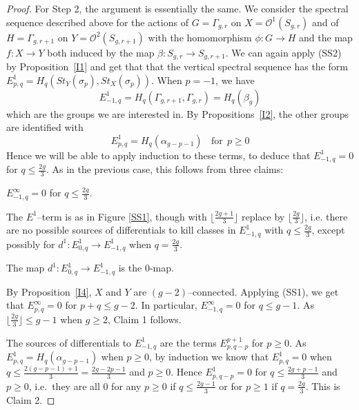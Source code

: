\documentclass[10pt]{amsart}
\newcommand{\no}{\noindent}
\newcommand{\OO}{\mathcal{O}}
\newcommand{\al}{\alpha}
\newcommand{\Ga}{\Gamma}
\newcommand{\s}{\sigma}
\begin{document}
\begin{proof}
For Step 2, the argument is essentially the same. 
We consider the spectral sequence described above for the actions of $G=\Ga_{g,r}$ on $X=\OO^1(S_{g,r})$ and of 
$H=\Ga_{g,r+1}$ on $Y=\OO^2(S_{g,r+1})$ with the homomorphism $\phi\colon G\to H$ and the map $f\colon X\to Y$ both induced by the map
$\beta\colon S_{g,r}\to S_{g,r+1}$.  
We can again apply (SS2) by Proposition~\ref{I1} and get that 
 that the vertical spectral sequence has the form 
$E^1_{p,q}=H_q(St_Y(\s_p),St_X(\s_p))$. 
When $p=-1$, we have  
$$E^1_{-1,q}=H_q(\Ga_{g,r+1},\Ga_{g,r})=H_q(\beta_g)$$ which are the groups we are interested in. 
By Propositions~\ref{I2}, the other groups are identified with 
$$E_{p,q}^1=H_q(\al_{g-p-1}) \ \ \ \ \textrm{for}\ \  p\ge 0$$
Hence we will be able to apply induction to these terms, 
to deduce that $E^1_{-1,q}=0$  for $q\le \frac{2g}{3}$. 
As in the previous case, this follows from three claims: 

\smallskip
\no {\em Claim 1:} 
$E^\infty_{-1,q}=0$ for $q\le \frac{2g}{3}$. 

\smallskip 
\no {\em Claim 2:} 
The $E^1$--term is as in Figure \ref{SS1}, though with $\lfloor \frac{2g+1}{3}\rfloor$ replace by
$\lfloor \frac{2g}{3}\rfloor$, i.e. there are no possible sources of differentials to kill classes in
$E^1_{-1,q}$ with $q\le \frac{2g}{3}$, except possibly for $d^1\colon E^1_{0,q}\to E^1_{-1,q}$ when $q=\frac{2g}{3}$. 

\smallskip
\no {\em Claim 3:} 
The map $d^1\colon E^1_{0,q}\to E^1_{-1,q}$ is the 0-map. 




By Proposition~\ref{I4}, $X$ and $Y$ are $(g-2)$--connected. Applying (SS1), we get that $E^\infty_{p,q}=0$ for 
$p+q\le g-2$. In particular, $E^\infty_{-1,q}=0$ for $q\le g-1$. As $\lfloor\frac{2g}{3}\rfloor\le g-1$ when $g\ge 2$, Claim 1
follows. 
 
The sources of differentials to $E_{-1,q}^1$ are the terms $E^{p+1}_{p,q-p}$ for $p\ge 0$. As
$E^1_{p,q}=H_{q}(\al_{g-p-1})$ when $p\ge 0$, by
induction we know that $E^1_{p,q}=0$ when $q\le \frac{2(g-p-1)+1}{3}=\frac{2g-2p-1}{3}$ and $p\ge 0$. 
Hence $E^1_{p,q-p}=0$ for $q\le \frac{2g+p-1}{3}$ and $p\ge 0$, i.e.~they are all 0 for any $p\ge 0$ if $q\le \frac{2g-1}{3}$ 
or for $p\ge 1$ if $q=\frac{2g}{3}$. This is Claim 2. 


\end{proof}
\end{document}
